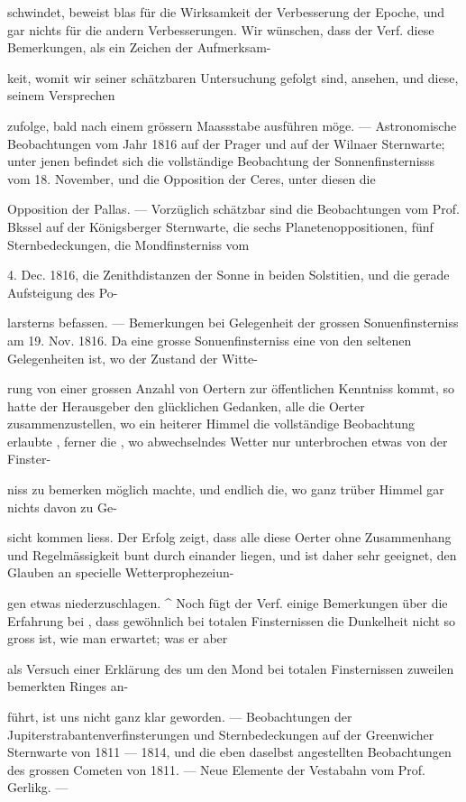 \documentclass[10pt,a4paper]{article}
\begin{document}
schwindet, beweist blas für die Wirksamkeit der Verbesserung der Epoche, und gar nichts für die andern Verbesserungen. Wir wünschen, dass der Verf. diese Bemerkungen, als ein Zeichen der Aufmerksam-

keit, womit wir seiner schätzbaren Untersuchung gefolgt sind, ansehen, und diese, seinem Versprechen

zufolge, bald nach einem grössern Maassstabe ausführen möge. — Astronomische Beobachtungen vom Jahr 1816 auf der Prager und auf der Wilnaer Sternwarte; unter jenen befindet sich die vollständige Beobachtung der Sonnenfinsternisss vom 18. November, und die Opposition der Ceres, unter diesen die

Opposition der Pallas. — Vorzüglich schätzbar sind die Beobachtungen vom Prof. Bkssel auf der Königsberger Sternwarte, die sechs Planetenoppositionen, fünf Sternbedeckungen, die Mondfinsterniss vom

4. Dec. 1816, die Zenithdistanzen der Sonne in beiden Solstitien, und die gerade Aufsteigung des Po-

larsterns befassen. — Bemerkungen bei Gelegenheit der grossen Sonuenfinsterniss am 19. Nov. 1816. Da eine grosse Sonuenfinsterniss eine von den seltenen Gelegenheiten ist, wo der Zustand der Witte-

rung von einer grossen Anzahl von Oertern zur öffentlichen Kenntniss kommt, so hatte der Herausgeber den glücklichen Gedanken, alle die Oerter zusammenzustellen, wo ein heiterer Himmel die vollständige Beobachtung erlaubte , ferner die , wo abwechselndes Wetter nur unterbrochen etwas von der Finster-

niss zu bemerken möglich machte, und endlich die, wo ganz trüber Himmel gar nichts davon zu Ge-

sicht kommen liess. Der Erfolg zeigt, dass alle diese Oerter ohne Zusammenhang und Regelmässigkeit bunt durch einander liegen, und ist daher sehr geeignet, den Glauben an specielle Wetterprophezeiun-

gen etwas niederzuschlagen. \textasciicircum{} Noch fügt der Verf. einige Bemerkungen über die Erfahrung bei , dass gewöhnlich bei totalen Finsternissen die Dunkelheit nicht so gross ist, wie man erwartet; was er aber

als Versuch einer Erklärung des um den Mond bei totalen Finsternissen zuweilen bemerkten Ringes an-

führt, ist uns nicht ganz klar geworden. — Beobachtungen der Jupiterstrabantenverfinsterungen und Sternbedeckungen auf der Greenwicher Sternwarte von 1811 — 1814, und die eben daselbst angestellten Beobachtungen des grossen Cometen von 1811. — Neue Elemente der Vestabahn vom Prof. Gerlikg. —
\end{document}
